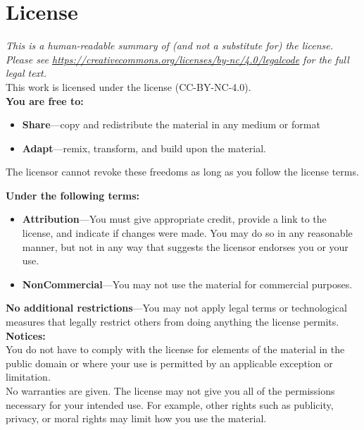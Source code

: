 \chapter{License}\label{s:license}

{\setlength{\parindent}{0em}

  \emph{
    This is a human-readable summary of (and not a substitute for) the license.
    Please see \url{https://creativecommons.org/licenses/by-nc/4.0/legalcode} for the full legal text.
  }\\

\noindent
This work is licensed under the
 license
(CC-BY-NC-4.0).\\

\noindent
\textbf{You are free to:}

\begin{itemize}
\item
  \textbf{Share}---copy and redistribute the material in any medium or
  format
\item
  \textbf{Adapt}---remix, transform, and build upon the material.
\end{itemize}

The licensor cannot revoke these freedoms as long as you follow the
license terms.

\textbf{Under the following terms:}

\begin{itemize}
\item
  \textbf{Attribution}---You must give appropriate credit, provide a link
  to the license, and indicate if changes were made. You may do so in
  any reasonable manner, but not in any way that suggests the licensor
  endorses you or your use. \\
\item
  \textbf{NonCommercial}---You may not use the material for commercial purposes.
\end{itemize}

\textbf{No additional restrictions}---You may not apply legal terms or
technological measures that legally restrict others from doing anything the
license permits.\\

\textbf{Notices:}\\

You do not have to comply with the license for elements of the
material in the public domain or where your use is permitted by an
applicable exception or limitation.\\

No warranties are given. The license may not give you all of the
permissions necessary for your intended use. For example, other rights
such as publicity, privacy, or moral rights may limit how you use the
material.

}
